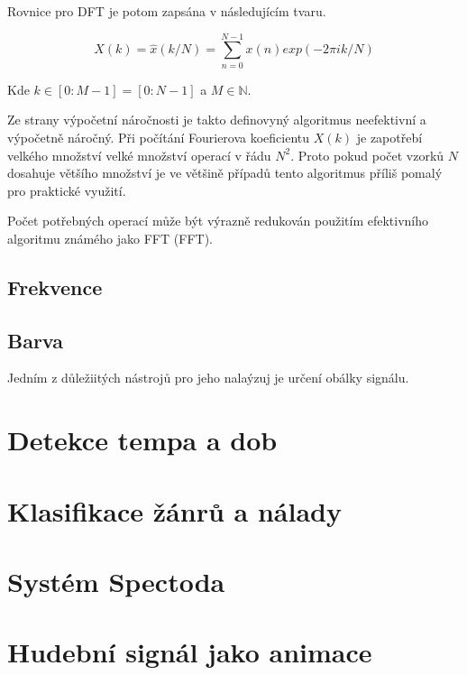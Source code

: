   Rovnice pro \acs{DFT} je potom zapsána v následujícím tvaru. 

  \begin{equation}
    X(k) = \hat{x}(k/N) = \sum_{n = 0}^{N - 1} x(n) exp(-2 \pi i k/N)
    \label{rov:DFT}
  \end{equation}

  Kde $ k \in [0:M - 1] = [0:N - 1] $ a $ M \in \mathbb{N}$.

  Ze strany výpočetní náročnosti je takto definovyný algoritmus neefektivní a výpočetně náročný.
  Při počítání Fourierova koeficientu $X(k)$ je zapotřebí velkého množství velké množství operací v řádu $N^2$.
  Proto pokud počet vzorků $N$ dosahuje většího množství je ve většině případů tento algoritmus příliš pomalý pro praktické využití.

  Počet potřebných operací může být výrazně redukován použitím efektivního algoritmu známého jako \acs{FFT} (\acl{FFT}).





  \subsection{Frekvence} \label{sec:Frekvence}

  \subsection{Barva} \label{sec:Barva}

  Jedním z důležiitých nástrojů pro jeho nalaýzuj je určení obálky signálu.

\section{Detekce tempa a dob}
\section{Klasifikace žánrů a nálady}

\section{Systém Spectoda}

\section{Hudební signál jako animace}